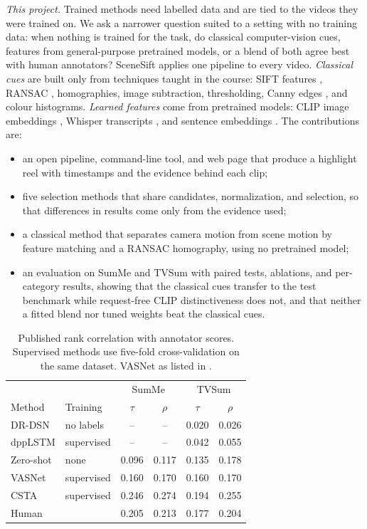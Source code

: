 \documentclass[conference]{IEEEtran}
\begin{document}
\emph{This project.} Trained methods need labelled data and are tied to the videos they were trained on. We ask a narrower question suited to a setting with no training data: when nothing is trained for the task, do classical computer-vision cues, features from general-purpose pretrained models, or a blend of both agree best with human annotators? SceneSift applies one pipeline to every video. \emph{Classical cues} are built only from techniques taught in the course: SIFT features \cite{lowe2004sift}, RANSAC \cite{fischler1981ransac}, homographies, image subtraction, thresholding, Canny edges \cite{canny1986}, and colour histograms. \emph{Learned features} come from pretrained models: CLIP image embeddings \cite{radford2021clip}, Whisper transcripts \cite{radford2023whisper}, and sentence embeddings \cite{reimers2019sbert}. The contributions are:
\begin{itemize}
\item an open pipeline, command-line tool, and web page that produce a highlight reel with timestamps and the evidence behind each clip;
\item five selection methods that share candidates, normalization, and selection, so that differences in results come only from the evidence used;
\item a classical method that separates camera motion from scene motion by feature matching and a RANSAC homography, using no pretrained model;
\item an evaluation on SumMe and TVSum with paired tests, ablations, and per-category results, showing that the classical cues transfer to the test benchmark while request-free CLIP distinctiveness does not, and that neither a fitted blend nor tuned weights beat the classical cues.
\end{itemize}
\begin{table}[t]
\caption{Published rank correlation with annotator scores. Supervised methods use five-fold cross-validation on the same dataset. VASNet as listed in \cite{son2024csta}.}
\label{tab:published}
\centering
\setlength{\tabcolsep}{4pt}
\begin{tabular}{@{}llcccc@{}}
\toprule
 & & \multicolumn{2}{c}{SumMe} & \multicolumn{2}{c}{TVSum} \\
Method & Training & $\tau$ & $\rho$ & $\tau$ & $\rho$ \\
\midrule
DR-DSN \cite{otani2019rethinking} & no labels & -- & -- & 0.020 & 0.026 \\
dppLSTM \cite{otani2019rethinking} & supervised & -- & -- & 0.042 & 0.055 \\
Zero-shot \cite{pang2024zeroshot} & none & 0.096 & 0.117 & 0.135 & 0.178 \\
VASNet & supervised & 0.160 & 0.170 & 0.160 & 0.170 \\
CSTA \cite{son2024csta} & supervised & 0.246 & 0.274 & 0.194 & 0.255 \\
Human \cite{otani2019rethinking,son2024csta} & & 0.205 & 0.213 & 0.177 & 0.204 \\
\bottomrule
\end{tabular}
\end{table}
\end{document}
